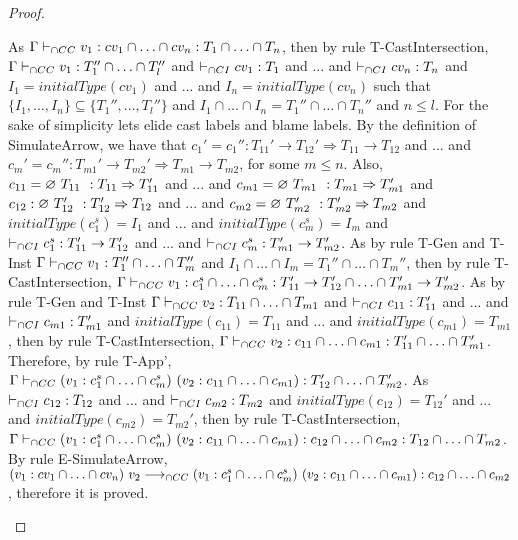 \documentclass[a4paper]{article}
\begin{document}
\begin{proof}
\begin{itemize}
    As $\Gamma \vdash_{\cap CC} v_1 : cv_1 \cap \ldots \cap cv_n : T_1 \cap \ldots \cap T_n$, then by rule T-CastIntersection, $\Gamma \vdash_{\cap CC} v_1 : T_1'' \cap \ldots \cap T_l''$ and $\vdash_{\cap CI} cv_1 : T_1$ and ... and $\vdash_{\cap CI} cv_n : T_n$ and $I_1 = initialType(cv_1)$ and ... and $I_n = initialType(cv_n)$ such that $\{I_1, \ldots, I_n\} \subseteq \{T_1'', \ldots, T_l''\}$ and $I_1 \cap \ldots \cap I_n = T_1'' \cap \ldots \cap T_n''$ and $n \leq l$.
    For the sake of simplicity lets elide cast labels and blame labels.
    By the definition of SimulateArrow, we have that $c_1' = c_1'' : T_{11}' \rightarrow T_{12}' \Rightarrow T_{11} \rightarrow T_{12}$ and ... and $c_m' = c_m'' : T_{m1}' \rightarrow T_{m2}' \Rightarrow T_{m1} \rightarrow T_{m2}$, for some $m \leq n$.
    Also, $c_{11} = \varnothing\ T_{11}\ ^{} : T_{11} \Rightarrow T_{11}'$ and ... and $c_{m1} = \varnothing\ T_{m1}\ ^{} : T_{m1} \Rightarrow T_{m1}'$ and $c_{12} : \varnothing\ T_{12}'\ ^{} : T_{12}' \Rightarrow T_{12}$ and ... and $c_{m2} = \varnothing\ T_{m2}'\ ^{} : T_{m2}' \Rightarrow T_{m2}$ and $initialType(c^s_1) = I_1$ and ... and $initialType(c^s_m) = I_m$ and $\vdash_{\cap CI} c^s_1 : T_{11}' \rightarrow T_{12}'$ and ... and $\vdash_{\cap CI} c^s_m : T_{m1}' \rightarrow T_{m2}'$.
    As by rule T-Gen and T-Inst $\Gamma \vdash_{\cap CC} v_1 : T_1'' \cap \ldots \cap T_m''$ and $I_1 \cap \ldots \cap I_m = T_1'' \cap \ldots \cap T_m''$, then by rule T-CastIntersection, $\Gamma \vdash_{\cap CC} v_1 : c^s_1 \cap \ldots \cap c^s_m : T_{11}' \rightarrow T_{12}' \cap \ldots \cap T_{m1}' \rightarrow T_{m2}'$.
    As by rule T-Gen and T-Inst $\Gamma \vdash_{\cap CC} v_2 : T_{11} \cap \ldots \cap T_{m1}$ and $\vdash_{\cap CI} c_{11} : T_{11}'$ and ... and $\vdash_{\cap CI} c_{m1} : T_{m1}'$ and $initialType(c_{11}) = T_{11}$ and ... and $initialType(c_{m1}) = T_{m1}$, then by rule T-CastIntersection, $\Gamma \vdash_{\cap CC} v_2 : c_{11} \cap \ldots \cap c_{m1} : T_{11}' \cap \ldots \cap T_{m1}'$.
    Therefore, by rule T-App', $\Gamma \iccts (v_1 : c^s_1 \cap \ldots \cap c^s_m)\ (v_2 : c_{11} \cap \ldots \cap c_{m1}) : T_{12}' \cap \ldots \cap T_{m2}'$.
    As $\vdash_{\cap CI} c_{12} : T_{12}$ and ... and $\vdash_{\cap CI} c_{m2} : T_{m2}$ and $initialType(c_{12}) = T_{12}'$ and ... and $initialType(c_{m2}) = T_{m2}'$, then by rule T-CastIntersection, $\Gamma \vdash_{\cap CC} (v_1 : c^s_1 \cap \ldots \cap c^s_m)\ (v_2 : c_{11} \cap \ldots \cap c_{m1}) : c_{12} \cap \ldots \cap c_{m2} : T_{12} \cap \ldots \cap T_{m2}$.
    By rule E-SimulateArrow, $(v_1 : cv_1 \cap \ldots \cap cv_n)\ v_2 \longrightarrow_{\cap CC}\\ (v_1 : c^s_1 \cap \ldots \cap c^s_m)\ (v_2 : c_{11} \cap \ldots \cap c_{m1}) : c_{12} \cap \ldots \cap c_{m2}$, therefore it is proved.

\end{itemize}
\end{proof}
\end{document}
